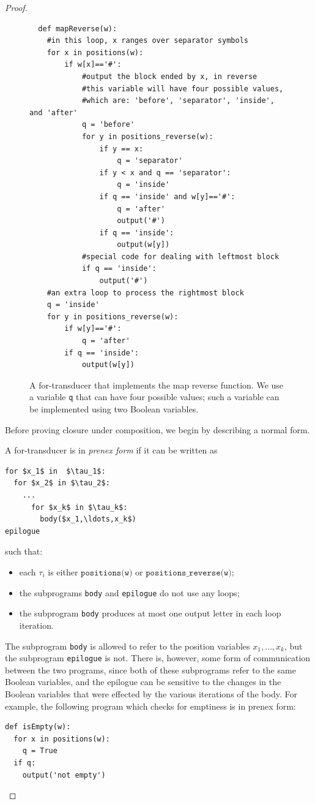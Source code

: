 \begin{proof}
\begin{figure}
\begin{lstlisting}
  def mapReverse(w):
    #in this loop, x ranges over separator symbols
    for x in positions(w):
        if w[x]=='#':
            #output the block ended by x, in reverse
            #this variable will have four possible values, 
            #which are: 'before', 'separator', 'inside', and 'after'
            q = 'before'
            for y in positions_reverse(w):
                if y == x:
                    q = 'separator'
                if y < x and q == 'separator':
                    q = 'inside'
                if q == 'inside' and w[y]=='#':
                    q = 'after'
                    output('#')
                if q == 'inside':
                    output(w[y])
            #special code for dealing with leftmost block
            if q == 'inside':
                output('#')
    #an extra loop to process the rightmost block
    q = 'inside'
    for y in positions_reverse(w):
        if w[y]=='#':
            q = 'after'
        if q == 'inside':
            output(w[y])       
\end{lstlisting}
\caption{\label{fig:map-reverse-for-transducer}
  A for-transducer that implements the map reverse function. We use a variable {\tt q} that can have four possible values; such a variable can be implemented using two Boolean variables.}
\end{figure}

Before proving closure under composition, we begin by describing a normal form.

\begin{definition}
\label{def:prenex-normal-form-for-transducers}
A for-transducer is in \emph{prenex form} if it can be written as
\begin{lstlisting}
for $x_1$ in  $\tau_1$:
  for $x_2$ in $\tau_2$:
    ...
      for $x_k$ in $\tau_k$:
        body($x_1,\ldots,x_k$)
epilogue
            \end{lstlisting}
such that: 
\begin{itemize}
  \item each $\tau_i$ is either $\texttt{positions(w)}$ or $\texttt{positions\_reverse(w)}$;
  \item the subprograms {\tt body} and {\tt epilogue} do not use any loops;
  \item the subprogram {\tt body} produces at most one output letter in each loop iteration.
\end{itemize}
\end{definition}
The subprogram {\tt body} is allowed to refer to the position variables $x_1,\ldots,x_k$, but the subprogram {\tt epilogue} is not. There is, however, some form of communication between the two programs, since both of these subprograms refer to the same Boolean variables, and the epilogue can be sensitive to the changes in the Boolean variables that were effected by the various iterations of the body. For example, the following program which checks for emptiness is in prenex  form: 
\begin{lstlisting}
def isEmpty(w):
  for x in positions(w):
    q = True
  if q:
    output('not empty')
\end{lstlisting}


\end{proof}
